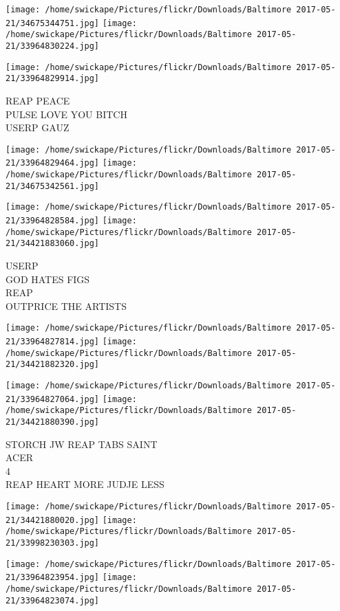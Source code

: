 \documentclass[10pt,letterpaper]{article}
\begin{document}
\texttt{[image: /home/swickape/Pictures/flickr/Downloads/Baltimore 2017-05-21/34675344751.jpg]}
\texttt{[image: /home/swickape/Pictures/flickr/Downloads/Baltimore 2017-05-21/33964830224.jpg]}

\vspace{0.25in}
\texttt{[image: /home/swickape/Pictures/flickr/Downloads/Baltimore 2017-05-21/33964829914.jpg]}

REAP PEACE\\
PULSE LOVE YOU BITCH\\
USERP GAUZ\\
\pagebreak

\texttt{[image: /home/swickape/Pictures/flickr/Downloads/Baltimore 2017-05-21/33964829464.jpg]}
\texttt{[image: /home/swickape/Pictures/flickr/Downloads/Baltimore 2017-05-21/34675342561.jpg]}

\texttt{[image: /home/swickape/Pictures/flickr/Downloads/Baltimore 2017-05-21/33964828584.jpg]}
\texttt{[image: /home/swickape/Pictures/flickr/Downloads/Baltimore 2017-05-21/34421883060.jpg]}

USERP\\
GOD HATES FIGS\\
REAP\\
OUTPRICE THE ARTISTS\\
\pagebreak

\texttt{[image: /home/swickape/Pictures/flickr/Downloads/Baltimore 2017-05-21/33964827814.jpg]}
\texttt{[image: /home/swickape/Pictures/flickr/Downloads/Baltimore 2017-05-21/34421882320.jpg]}

\texttt{[image: /home/swickape/Pictures/flickr/Downloads/Baltimore 2017-05-21/33964827064.jpg]}
\texttt{[image: /home/swickape/Pictures/flickr/Downloads/Baltimore 2017-05-21/34421880390.jpg]}

STORCH JW REAP TABS SAINT\\
ACER\\
4\\
REAP HEART MORE JUDJE LESS\\
\pagebreak

\texttt{[image: /home/swickape/Pictures/flickr/Downloads/Baltimore 2017-05-21/34421880020.jpg]}
\texttt{[image: /home/swickape/Pictures/flickr/Downloads/Baltimore 2017-05-21/33998230303.jpg]}

\texttt{[image: /home/swickape/Pictures/flickr/Downloads/Baltimore 2017-05-21/33964823954.jpg]}
\texttt{[image: /home/swickape/Pictures/flickr/Downloads/Baltimore 2017-05-21/33964823074.jpg]}
\end{document}
